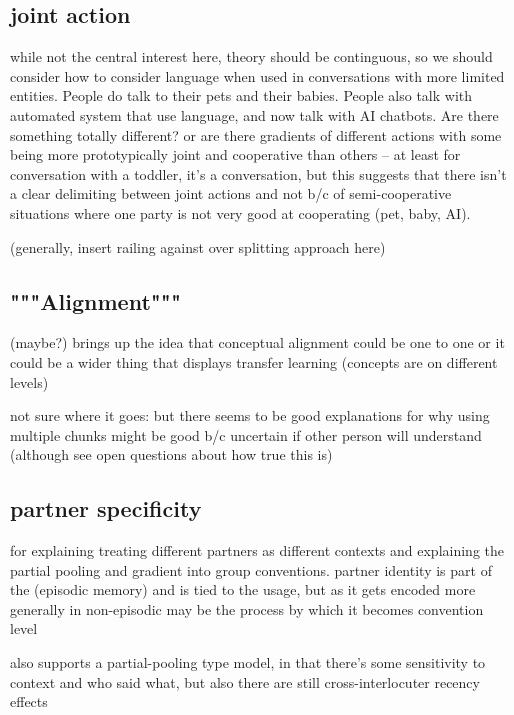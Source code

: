 \documentclass[]{article}
\begin{document}
\subsection{joint action}
\cite{clark1996} while not the central interest here, theory should be continguous, so we should consider how to consider language when used in conversations with more limited entities. People do talk to their pets and their babies. People also talk with automated system that use language, and now talk with AI chatbots. Are there something totally different? or are there gradients of different actions with some being more prototypically joint and cooperative than others -- at least for conversation with a toddler, it's a conversation, but this suggests that there isn't a clear delimiting between joint actions and not b/c of semi-cooperative situations where one party is not very good at cooperating (pet, baby, AI). 

(generally, insert railing against over splitting approach here)


\subsection{"""Alignment"""}

\cite{eliav2023} (maybe?) brings up the idea that conceptual alignment could be one to one or it could be a wider thing that displays transfer learning (concepts are on different levels) 

not sure where it goes: but there seems to be good explanations for why using multiple chunks might be good b/c uncertain if other person will understand (although see open questions about how true this is) 



\subsection{partner specificity}

\cite{hawkins2021} for explaining treating different partners as different contexts and explaining the partial pooling and gradient into group conventions. partner identity is part of the (episodic memory) and is tied to the usage, but as it gets encoded more generally in non-episodic may be the process by which it becomes convention level 

\cite{yoon2014} also supports a partial-pooling type model, in that there's some sensitivity to context and who said what, but also there are still cross-interlocuter recency effects
\end{document}
